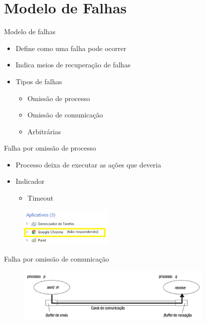 \documentclass[aspectratio=169,
				xcolor=table]{beamer}
\begin{document}
	\section{Modelo de Falhas}
	\begin{frame}{Modelo de falhas}
		\begin{itemize}
			\item Define como uma falha pode ocorrer
			\vspace{1em}
			\item Indica meios de recuperação de falhas
			\vspace{1em}
			\item Tipos de falhas
			\begin{itemize}
				\item Omissão de processo
				\item Omissão de comunicação
				\item Arbitrárias
			\end{itemize}
		\end{itemize}
	\end{frame}
	
	\begin{frame}{Falha por omissão de processo}
		\begin{itemize}
			\item Processo deixa de executar as ações que deveria
			\vspace{1em}
			\item Indicador
			\begin{itemize}
				\item Timeout
			\end{itemize}
		\end{itemize}
		\begin{figure}[hbtp]
		\centering
		\includegraphics[width=0.4\textwidth, keepaspectratio]{../figs/cap03/omissaoprocesso.png}
		\end{figure}		
	\end{frame}
	
	\begin{frame}{Falha por omissão de comunicação}		
		\begin{figure}[hbtp]
		\centering
		\includegraphics[width=0.85\textwidth, keepaspectratio]{../figs/cap03/omissaocomunicacao.png}
		\end{figure}	
	\end{frame}
	
\end{document}

